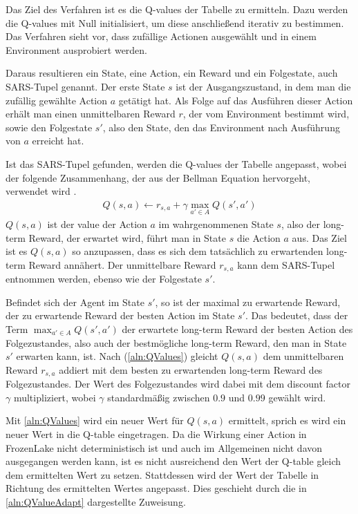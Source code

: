 \documentclass[11pt]{scrartcl}
\begin{document}
\noindent
Das Ziel des Verfahren ist es die Q-values der Tabelle zu ermitteln. Dazu werden die
Q-values mit Null initialisiert, um diese anschließend iterativ zu bestimmen. Das Verfahren 
sieht vor, dass zufällige Actionen ausgewählt und in einem Environment ausprobiert werden.

Daraus resultieren ein State, eine Action, ein Reward und ein Folgestate, auch SARS-Tupel
genannt. Der erste State $s$ ist der Ausgangszustand, in dem man die zufällig gewählte
Action $a$ getätigt hat. Als Folge auf das Ausführen dieser Action erhält man einen
unmittelbaren Reward $r$, der vom Environment bestimmt wird, sowie den Folgestate $s'$,
also den State, den das Environment nach Ausführung von $a$ erreicht hat.

Ist das SARS-Tupel gefunden, werden die Q-values der Tabelle angepasst, wobei der folgende
Zusammenhang, der aus der Bellman Equation hervorgeht, verwendet wird
\cite[~S.193 ff.]{L2018}.
\begin{align}
  Q(s, a) \leftarrow r_{s,a} + \gamma \max_{a' \in A}Q(s', a')
  \label{aln:QValues}
\end{align}
\noindent
$Q(s, a)$ ist der value der Action $a$ im wahrgenommenen State $s$, also der long-term
Reward, der erwartet wird, führt man in State $s$ die Action $a$ aus. Das Ziel ist es
$Q(s, a)$ so anzupassen, dass es sich dem tatsächlich zu erwartenden long-term Reward
annähert. Der unmittelbare Reward $r_{s,a}$ kann dem SARS-Tupel entnommen werden, ebenso
wie der Folgestate $s'$.

Befindet sich der Agent im State $s'$, so ist der maximal zu erwartende Reward, der 
zu erwartende Reward der besten Action im State $s'$. Das bedeutet, dass der Term
$\max_{a'\in A} Q(s', a')$ der erwartete long-term Reward der besten Action des
Folgezustandes, also auch der bestmögliche long-term Reward, den man in State $s'$
erwarten kann, ist. Nach (\ref{aln:QValues}) gleicht $Q(s, a)$ dem unmittelbaren Reward
$r_{s,a}$ addiert mit dem besten zu erwartenden long-term Reward des Folgezustandes. Der
Wert des Folgezustandes wird dabei mit dem discount factor $\gamma$ multipliziert, wobei 
$\gamma$ standardmäßig zwischen $0.9$ und $0.99$ gewählt wird.

Mit \autoref{aln:QValues} wird ein neuer Wert für $Q(s, a)$ ermittelt, sprich es wird ein
neuer Wert in die Q-table eingetragen. Da die Wirkung einer Action in FrozenLake nicht
deterministisch ist und auch im Allgemeinen nicht davon ausgegangen werden kann, ist es
nicht ausreichend den Wert der Q-table gleich dem ermittelten Wert zu setzen. Stattdessen
wird der Wert der Tabelle in Richtung des ermittelten Wertes angepasst. Dies geschieht durch 
die in \autoref{aln:QValueAdapt} dargestellte Zuweisung.
\end{document}
